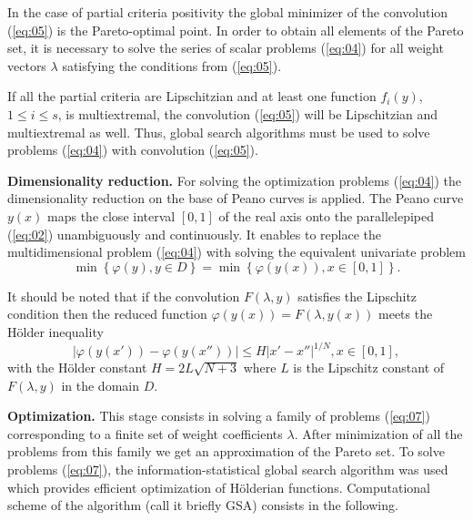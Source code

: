 \documentclass[runningheads]{llncs}
\begin{document}

In the case of partial criteria positivity the global minimizer of the convolution (\ref{eq:05}) is the Pareto-optimal point. In order to obtain all elements of the Pareto set, it is necessary to solve the series of scalar problems (\ref{eq:04}) for all weight vectors $\lambda$ satisfying the conditions from (\ref{eq:05}). 

If all the partial criteria are Lipschitzian and at least one function $f_i(y)$, $1 \leq i \leq s$, is multiextremal, the convolution (\ref{eq:05}) will be Lipschitzian and multiextremal as well. Thus, global search algorithms must be used to solve problems (\ref{eq:04}) with convolution (\ref{eq:05}).

\textbf{Dimensionality reduction.} For solving the optimization problems (\ref{eq:04}) the dimensionality reduction \cite{Gergel2019_2,Gergel2018,GergelKozinov2020} on the base of Peano curves is applied. The Peano curve $y(x)$ maps the close interval $[0,1]$ of the real axis onto the parallelepiped (\ref{eq:02}) unambiguously and continuously. It enables to replace the multidimensional problem (\ref{eq:04}) with solving the equivalent univariate problem
\begin{equation}
\label{eq:07}
\min \left\{\varphi(y), y \in D\right\} = \min\left\{ \varphi(y(x)), x \in [0,1] \right\}.
\end{equation}

It should be noted that if the convolution $F(\lambda,y)$ satisfies the Lipschitz condition then the reduced function $\varphi(y(x)) = F(\lambda,y(x))$ meets the H{\" o}lder inequality
\begin{equation}
\label{eq:08}
|\varphi(y(x')) - \varphi(y(x''))| \leq H |x' - x''|^{1/N} , x \in [0,1],
\end{equation}
with the H{\" o}lder constant $H=2L\sqrt{N+3}$ where $L$ is the Lipschitz constant of $F(\lambda,y)$ in the domain $D$.

\textbf{Optimization.} This stage consists in solving a family of problems (\ref{eq:07}) corresponding to a finite set of weight coefficients $\lambda$. After minimization of all the problems from this family we get an approximation of the Pareto set. To solve problems (\ref{eq:07}), the information-statistical global search algorithm \cite{ML_MCO_2023,Gergel2019_2,Gergel2018,GergelKozinov2020,Strongin2000,Sergeyev2013} was used which provides efficient optimization of H{\" o}lderian functions. Computational scheme of the algorithm (call it briefly GSA) consists in the following.
\end{document}
